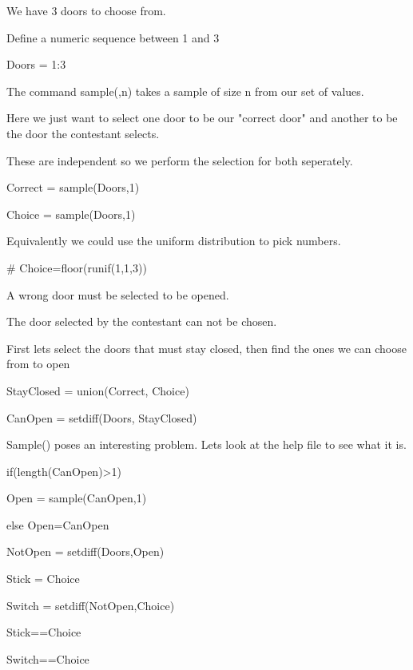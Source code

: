 \documentclass[a4paper,12pt]{article}
\begin{document}
We have 3 doors to choose from.


Define a numeric sequence between 1 and 3


Doors = 1:3 


The command sample(,n) takes a sample of size n from our set of values.

Here we just want to select one door to be our "correct door" and another to be the door the contestant selects.


These are independent so we perform the selection for both seperately.








Correct = sample(Doors,1)

Choice = sample(Doors,1)



Equivalently we could use the uniform distribution to pick numbers.


# Choice=floor(runif(1,1,3))



A wrong door must be selected to be opened. 


The door selected by the contestant can not be chosen.

First lets select the doors that must stay closed, then find the ones we can choose from to open









StayClosed = union(Correct, Choice)


CanOpen = setdiff(Doors, StayClosed)




Sample() poses an interesting problem. Lets look at the help file to see what it is.










if(length(CanOpen)>1)

{
	
	Open = sample(CanOpen,1) 
	
}else {Open=CanOpen}


NotOpen = setdiff(Doors,Open)


Stick = Choice

Switch = setdiff(NotOpen,Choice)


Stick==Choice

Switch==Choice
\end{document}
